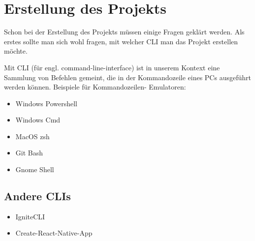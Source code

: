 \chapter{Erstellung des Projekts}
Schon bei der Erstellung des Projekts müssen einige Fragen geklärt werden. Als erstes sollte man
sich wohl fragen, mit welcher CLI man das Projekt erstellen möchte.

Mit CLI (für engl. command-line-interface) ist in unserem Kontext eine Sammlung von Befehlen
gemeint, die in der Kommandozeile eines PCs ausgeführt werden können. Beispiele für Kommandozeilen-
Emulatoren:

\begin{itemize}
  \item Windows Powershell
  \item Windows Cmd
  \item MacOS zsh
  \item Git Bash
  \item Gnome Shell
\end{itemize}

\newpage

\newpage

\newpage

\section{Andere CLIs}
\begin{itemize}
  \item IgniteCLI \cite{ignitecli}
  \item Create-React-Native-App \cite{createReactNativeApp}
\end{itemize}